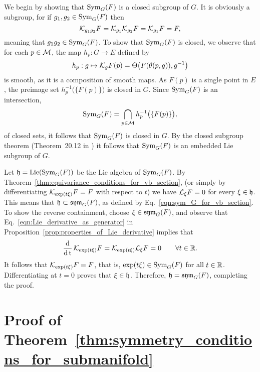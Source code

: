 \documentclass[twoside,11pt]{article}
\begin{document}
    We begin by showing that $\operatorname{Sym}_G(F)$ is a closed subgroup of $G$.
    It is obviously a subgroup, for if $g_1, g_2 \in \operatorname{Sym}_G(F)$ then
    \begin{equation}
        {\mathcal{K}}_{g_1 g_2} F = {\mathcal{K}}_{g_1} {\mathcal{K}}_{g_2} F = {\mathcal{K}}_{g_1} F = F,
    \end{equation}
    meaning that $g_1 g_2 \in \operatorname{Sym}_G(F)$.
    To show that $\operatorname{Sym}_G(F)$ is closed, we observe that for each $p\in{\mathcal{M}}$, the map $h_p : G \to E$ defined by
    \begin{equation}
        h_p: g \mapsto {\mathcal{K}}_g F(p) = \Theta\big( F(\theta(p,g)) , g^{-1} \big)
    \end{equation}
    is smooth, as it is a composition of smooth maps.
    As $F(p)$ is a single point in $E$, the preimage set $h_p^{-1}\big( \{ F(p) \} \big)$ is closed in $G$.
    Since $\operatorname{Sym}_G(F)$ is an intersection,
    \begin{equation}
        \operatorname{Sym}_G(F) = \bigcap_{p\in{\mathcal{M}}} h_p^{-1}\big( \{ F(p) \} \big),
    \end{equation}
    of closed sets, it follows that $\operatorname{Sym}_G(F)$ is closed in $G$.
    By the closed subgroup theorem (Theorem~20.12 in \citet{Lee2013introduction}) it follows that $\operatorname{Sym}_G(F)$ is an embedded Lie subgroup of $G$.

    Let ${\mathfrak{h}} = \operatorname{Lie}(\operatorname{Sym}_G(F))$ be the Lie algebra of $\operatorname{Sym}_G(F)$.
    By Theorem~\ref{thm:equivariance_conditions_for_vb_section}, (or simply by differentiating ${\mathcal{K}}_{\exp(t\xi)} F = F$ with respect to $t$) we have ${\mathcal{L}}_{\xi} F = 0$ for every $\xi \in {\mathfrak{h}}$.
    This means that ${\mathfrak{h}} \subset \operatorname{\mathfrak{sym}}_G(F)$, as defined by Eq.~\ref{eqn:sym_G_for_vb_section}.
    To show the reverse containment, choose $\xi \in \operatorname{\mathfrak{sym}}_G(F)$, and observe that Eq.~\ref{eqn:Lie_derivative_as_generator} in Proposition~\ref{prop:properties_of_Lie_derivative} implies that
    \begin{equation}
        \operatorname{\frac{\operatorname{\mathrm{d}}}{\operatorname{\mathrm{d}} t}} {\mathcal{K}}_{\exp(t\xi)} F = {\mathcal{K}}_{\exp(t\xi)} {\mathcal{L}}_{\xi} F = 0 \qquad \forall t\in\mathbb{R}.
    \end{equation}
    It follows that ${\mathcal{K}}_{\exp(t\xi)} F = F$, that is, $\exp(t\xi)\in\operatorname{Sym}_G(F)$ for all $t\in\mathbb{R}$.
    Differentiating at $t=0$ proves that $\xi\in{\mathfrak{h}}$.
    Therefore, ${\mathfrak{h}} = \operatorname{\mathfrak{sym}}_G(F)$, completing the proof.
\hfill\qedsymbol

\section{Proof of Theorem~\ref{thm:symmetry_conditions_for_submanifold}}
\label{app:symmetry_conditions_for_submanifold}
\end{document}

